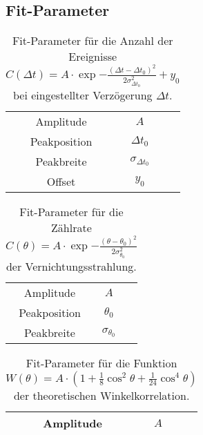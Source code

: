 \subsection{Fit-Parameter}
\label{sec:fitval}

\begin{table}[H]
	\centering
	\caption{Fit-Parameter für die Anzahl der Ereignisse $C(\Delta t) = A \cdot \exp{-\frac{(\Delta t - \Delta t_0)^2}{2 \sigma_{\Delta t_0}^2}} + y_0$ bei eingestellter Verzögerung $\Delta t$.}
	\label{fig:fitval1}
	\begin{tabular}{cc|c}
		\toprule
		Amplitude & $A$ &  \\
		Peakposition & $\Delta t_0$ &  \\
		Peakbreite & $\sigma_{\Delta t_0}$ &  \\
		Offset & $y_0$ & \\ \bottomrule
	\end{tabular}
\end{table}

\begin{table}[H]
	\centering
	\caption{Fit-Parameter für die Zählrate $C(\theta) = A \cdot \exp{-\frac{(\theta - \theta_0)^2}{2 \sigma_{\theta_0}^2}}$ der Vernichtungsstrahlung.}
	\label{fig:fitval3}
	\begin{tabular}{cc|c}
		\toprule
		Amplitude & $A$ &  \\
		Peakposition & $\theta_0$ &  \\
		Peakbreite & $\sigma_{\theta_0}$ &  \\ \bottomrule
	\end{tabular}
\end{table}

\begin{table}[H]
	\centering
	\caption{Fit-Parameter für die Funktion $W(\theta) = A \cdot \left( 1 + \frac{1}{8} \cos^2 \theta + \frac{1}{24} \cos^4 \theta \right)$ der theoretischen Winkelkorrelation.}
	\label{fig:fitval4}
	\begin{tabular}{cc|c}
		\toprule
		Amplitude & $A$ &  \\ \bottomrule
	\end{tabular}
\end{table}

